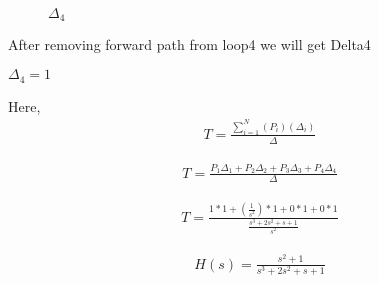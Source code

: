 \begin{enumerate}[label=\thesection.\arabic*.,ref=\thesection.\theenumi]
\begin{figure}[!ht]
\caption{$\Delta_4$}
\label{fig:sec_order}
\end{figure}

After removing forward path from loop4 we will get Delta4

$\Delta_4 = 1$

Here, 
\begin{align}
T=\frac{\sum_{i=1}^{N}(P_i)(\Delta_i)}{\Delta}
\end{align}

\begin{align}
T=\frac{P_1 \Delta_1+P_2 \Delta_2+P_3 \Delta_3+P_4 \Delta_4}{\Delta}
\end{align}

\begin{align}
T=\frac{1*1 +(\frac{1}{s^2})*1 + 0*1 + 0*1 }{\frac{s^3+2s^2+s+1}{s^2}}
\end{align}

\begin{align}
H(s)=\frac{s^2+1}{s^3+2s^2+s+1}
\end{align}
\renewcommand{\thefigure}{\theenumi}

\end{enumerate}